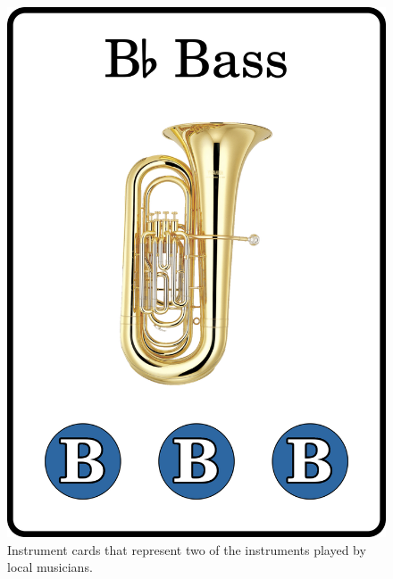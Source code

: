 \documentclass[a6paper, 12pt, parskip=half, DIV=14]{scrartcl}
\begin{document}
\begin{figure}[h]
    \includegraphics[scale=0.065]{Images/CardImages/bass_display_front.png}
	\caption*{Instrument cards that represent two of the instruments played by local musicians.}
\end{figure}

\newpage
\enlargethispage{2\baselineskip}
\end{document}
